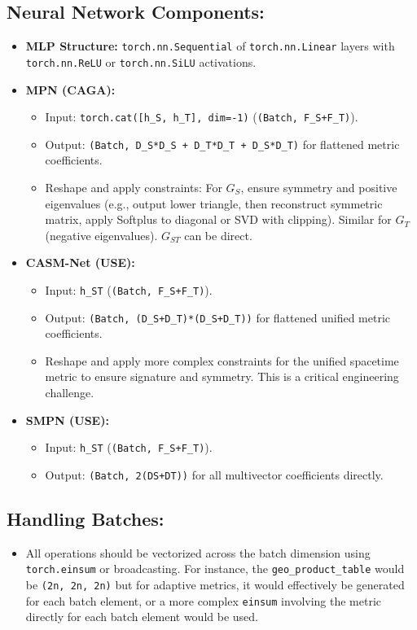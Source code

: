 \documentclass[11pt]{article}
\newcommand{\Hst}{h_{ST}} %
\begin{document}
\subsection{Neural Network Components:}
\begin{itemize}[noitemsep]
    \item \textbf{MLP Structure:} \texttt{torch.nn.Sequential} of \texttt{torch.nn.Linear} layers with \texttt{torch.nn.ReLU} or \texttt{torch.nn.SiLU} activations.
    \item \textbf{MPN (CAGA):}
    \begin{itemize}[noitemsep]
        \item Input: \texttt{torch.cat([h\_S, h\_T], dim=-1)} (\texttt{(Batch, F\_S+F\_T)}).
        \item Output: \texttt{(Batch, D\_S*D\_S + D\_T*D\_T + D\_S*D\_T)} for flattened metric coefficients.
        \item Reshape and apply constraints: For $G_S$, ensure symmetry and positive eigenvalues (e.g., output lower triangle, then reconstruct symmetric matrix, apply Softplus to diagonal or SVD with clipping). Similar for $G_T$ (negative eigenvalues). $G_{ST}$ can be direct.
    \end{itemize}
    \item \textbf{CASM-Net (USE):}
    \begin{itemize}[noitemsep]
        \item Input: \texttt{\Hst} (\texttt{(Batch, F\_S+F\_T)}).
        \item Output: \texttt{(Batch, (D\_S+D\_T)*(D\_S+D\_T))} for flattened unified metric coefficients.
        \item Reshape and apply more complex constraints for the unified spacetime metric to ensure signature and symmetry. This is a critical engineering challenge.
    \end{itemize}
    \item \textbf{SMPN (USE):}
    \begin{itemize}[noitemsep]
        \item Input: \texttt{\Hst} (\texttt{(Batch, F\_S+F\_T)}).
        \item Output: \texttt{(Batch, 2\textasciicirc (DS+DT))} for all multivector coefficients directly.
    \end{itemize}
\end{itemize}

\subsection{Handling Batches:}
\begin{itemize}[noitemsep]
    \item All operations should be vectorized across the batch dimension using \texttt{torch.einsum} or broadcasting. For instance, the \texttt{geo\_product\_table} would be \texttt{(2\textasciicirc n, 2\textasciicirc n, 2\textasciicirc n)} but for adaptive metrics, it would effectively be generated for each batch element, or a more complex \texttt{einsum} involving the metric directly for each batch element would be used.
\end{itemize}
\end{document}
